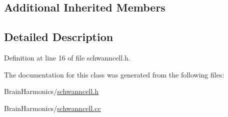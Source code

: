 \subsection*{Additional Inherited Members}


\subsection{Detailed Description}


Definition at line 16 of file schwanncell.\+h.



The documentation for this class was generated from the following files\+:\begin{DoxyCompactItemize}
\item 
Brain\+Harmonics/\mbox{\hyperlink{schwanncell_8h}{schwanncell.\+h}}\item 
Brain\+Harmonics/\mbox{\hyperlink{schwanncell_8cc}{schwanncell.\+cc}}\end{DoxyCompactItemize}

